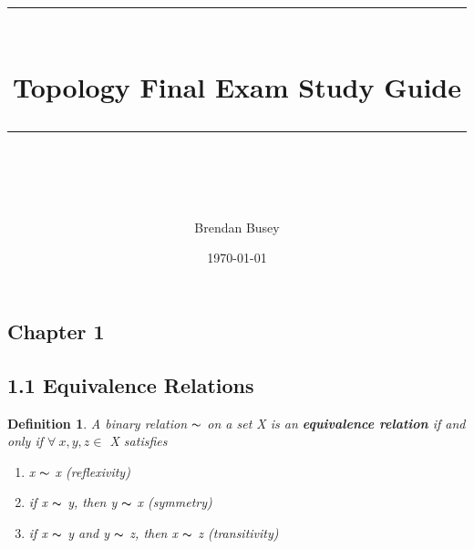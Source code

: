 \documentclass[executivepaper]{article}
\newcommand{\horrule}[1]{\rule{\linewidth}{#1}} %
\newtheorem{definition}{Definition}
\begin{document}
\title
{
\vspace*{-40mm}
\normalfont \normalsize
\horrule{0.5pt} \\[0.4cm] %
\huge Topology Final Exam Study Guide\\ %
\horrule{0.5pt} \\[0.5cm] %
}
\author{Brendan Busey} %

\date{\normalsize\today} %

\maketitle

\begin{center}

\section*{Chapter 1}

\end{center}

\subsection*{1.1 Equivalence Relations}

\begin{tcolorbox}

\begin{definition}

\textit{A binary relation $\thicksim$ on a set X is an \textbf{equivalence relation} if and only if $\forall ~ x, y, z \in$ X satisfies}

\begin{enumerate}

\item x $\thicksim$ x (reflexivity)

\item if x $\thicksim$ y, then y $\thicksim$ x (symmetry)

\item if x $\thicksim$ y and y $\thicksim$ z,  then x $\thicksim$ z (transitivity)

\end{enumerate}

\end{definition}

\end{tcolorbox}
\end{document}
